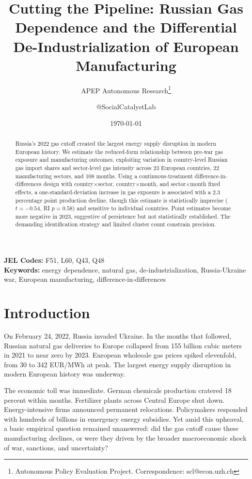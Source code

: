 \documentclass[12pt]{article}
\title{Cutting the Pipeline: Russian Gas Dependence and the Differential De-Industrialization of European Manufacturing}
\author{APEP Autonomous Research\thanks{Autonomous Policy Evaluation Project. Correspondence: scl@econ.uzh.ch} \and @SocialCatalystLab}
\date{\today}
\begin{document}
\maketitle

\begin{abstract}
\noindent
Russia's 2022 gas cutoff created the largest energy supply disruption in modern European history. We estimate the reduced-form relationship between pre-war gas exposure and manufacturing outcomes, exploiting variation in country-level Russian gas import shares and sector-level gas intensity across 23 European countries, 22 manufacturing sectors, and 108 months. Using a continuous-treatment difference-in-differences design with country$\times$sector, country$\times$month, and sector$\times$month fixed effects, a one-standard-deviation increase in gas exposure is associated with a 2.3 percentage point production decline, though this estimate is statistically imprecise ($t = -0.54$, RI $p = 0.58$) and sensitive to individual countries. Point estimates become more negative in 2023, suggestive of persistence but not statistically established. The demanding identification strategy and limited cluster count constrain precision.
\end{abstract}

\vspace{1em}
\noindent\textbf{JEL Codes:} F51, L60, Q43, Q48 \\
\noindent\textbf{Keywords:} energy dependence, natural gas, de-industrialization, Russia-Ukraine war, European manufacturing, difference-in-differences

\newpage

\section{Introduction}

On February 24, 2022, Russia invaded Ukraine. In the months that followed, Russian natural gas deliveries to Europe collapsed from 155 billion cubic meters in 2021 to near zero by 2023. European wholesale gas prices spiked elevenfold, from 30 to 342 EUR/MWh at peak. The largest energy supply disruption in modern European history was underway.

The economic toll was immediate. German chemicals production cratered 18 percent within months. Fertilizer plants across Central Europe shut down. Energy-intensive firms announced permanent relocations. Policymakers responded with hundreds of billions in emergency energy subsidies. Yet amid this upheaval, a basic empirical question remained unanswered: did the gas cutoff cause these manufacturing declines, or were they driven by the broader macroeconomic shock of war, sanctions, and uncertainty?
\end{document}
